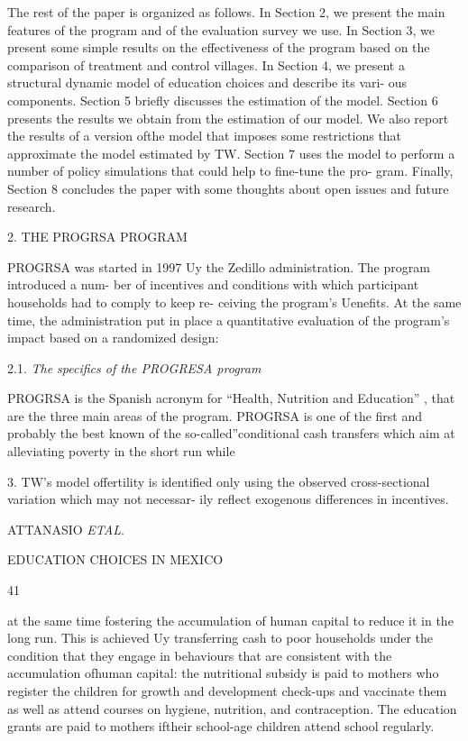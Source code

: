 The rest of the paper is organized as follows. In Section 2, we present the main features of the program and of the evaluation survey we use. In Section 3, we present some simple results on the effectiveness of the program based on the comparison of treatment and control villages. In Section 4, we present a structural dynamic model of education choices and describe its vari- ous components. Section 5 briefly discusses the estimation of the model. Section 6 presents the results we obtain from the estimation of our model. We also report the results of a version ofthe model that imposes some restrictions that approximate the model estimated by TW. Section 7 uses the model to perform a number of policy simulations that could help to fine-tune the pro- gram. Finally, Section 8 concludes the paper with some thoughts about open issues and future research.

2. THE PROGRSA PROGRAM

PROGRSA was started in 1997 Uy the Zedillo administration. The program introduced a num- ber of incentives and conditions with which participant households had to comply to keep re- ceiving the program's Uenefits. At the same time, the administration put in place a quantitative evaluation of the program's impact based on a randomized design:

2.1. {\it The specifics of the PROGRESA program}

PROGRSA is the Spanish acronym for ``Health, Nutrition and Education'' , that are the three main areas of the program. PROGRSA is one of the first and probably the best known of the so-called''conditional cash transfers which aim at alleviating poverty in the short run while

3. TW's model offertility is identified only using the observed cross-sectional variation which may not necessar- ily reflect exogenous differences in incentives.

ATTANASIO {\it ETAL}.

EDUCATION CHOICES IN MEXICO

41

at the same time fostering the accumulation of human capital to reduce it in the long run. This is achieved Uy transferring cash to poor households under the condition that they engage in behaviours that are consistent with the accumulation ofhuman capital: the nutritional subsidy is paid to mothers who register the children for growth and development check-ups and vaccinate them as well as attend courses on hygiene, nutrition, and contraception. The education grants are paid to mothers iftheir school-age children attend school regularly.

